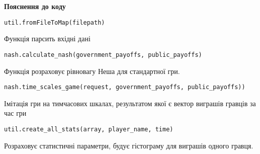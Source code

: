 
\textbf{Пояснення до коду}
\begin{lstlisting}[style=csharpinlinestyle]
util.fromFileToMap(filepath) 
\end{lstlisting}
Функція парсить вхідні дані

\begin{lstlisting}[style=csharpinlinestyle]
nash.calculate_nash(government_payoffs, public_payoffs)
\end{lstlisting}
Функція розраховує рівновагу Неша для стандартної гри.


\begin{lstlisting}[style=csharpinlinestyle]
nash.time_scales_game(request, government_payoffs, public_payoffs))
\end{lstlisting}
Імітація гри на тимчасових шкалах, результатом якої є вектор виграшів гравців за час гри

\begin{lstlisting}[style=csharpinlinestyle]
util.create_all_stats(array, player_name, time)
\end{lstlisting}
Розраховує статистичні параметри, будує гістограму для виграшів одного гравця.

